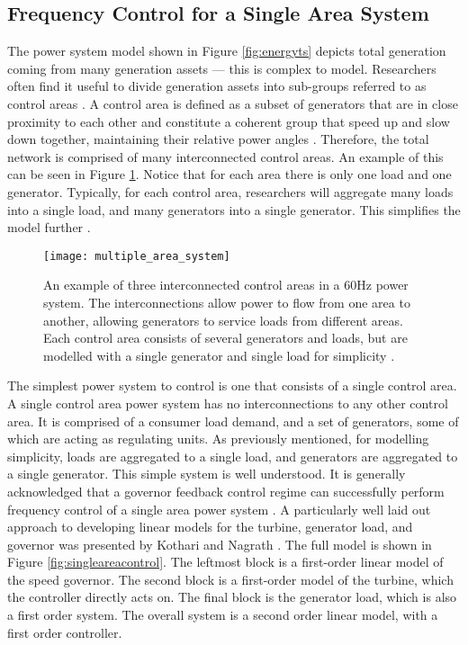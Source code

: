 \subsection{Frequency Control for a Single Area System}\label{oneareapowersystem}
The power system model shown in Figure \ref{fig:energyts} depicts total generation coming from many generation assets --- this is complex to model. Researchers often find it useful to divide generation assets into sub-groups referred to as control areas \cite{Kothari2011}. A control area is defined as a subset of generators that are in close proximity to each other and constitute a coherent group that speed up and slow down together, maintaining their relative power angles \cite{Kothari2011}. Therefore, the total network is comprised of many interconnected control areas. An example of this can be seen in Figure \ref{fig:interconnectedpa}. Notice that for each area there is only one load and one generator. Typically, for each control area, researchers will aggregate many loads into a single load, and many generators into a single generator. This simplifies the model further \cite{Grainger1994}.
\begin{figure}[ht]
	\centering
	\texttt{[image: multiple\_area\_system]}
	\caption{An example of three interconnected control areas in a 60$\si{\hertz}$ power system. The interconnections allow power to flow from one area to another, allowing generators to service loads from different areas. Each control area consists of several generators and loads, but are modelled with a single generator and single load for simplicity \cite{Grainger1994}.}
	\label{fig:interconnectedpa}
\end{figure}

The simplest power system to control is one that consists of a single control area. A single control area power system has no interconnections to any other control area. It is comprised of a consumer load demand, and a set of generators, some of which are acting as regulating units. As previously mentioned, for modelling simplicity, loads are aggregated to a single load, and generators are aggregated to a single generator. This simple system is well understood. It is generally acknowledged that a governor feedback control regime can successfully perform frequency control of a single area power system \cite{Wood2013, Grainger1994, Kothari2011}. A particularly well laid out approach to developing linear models for the turbine, generator load, and governor was presented by Kothari and Nagrath \cite{Kothari2011}. The full model is shown in Figure \ref{fig:singleareacontrol}. The leftmost block is a first-order linear model of the speed governor. The second block is a first-order model of the turbine, which the controller directly acts on. The final block is the generator load, which is also a first order system. The overall system is a second order linear model, with a first order controller.

